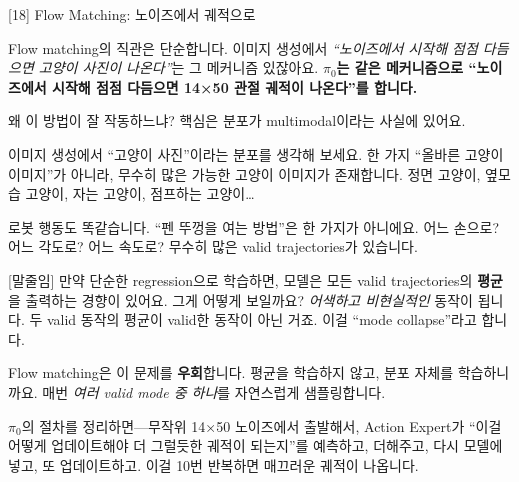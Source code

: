 \documentclass[aspectratio=169,10pt]{beamer}
\newenvironment{script}{%
  \footnotesize
  \setlength{\parskip}{0.5em}
  \setlength{\parindent}{0pt}
}{}
\begin{document}
\begin{frame}{[18] Flow Matching: 노이즈에서 궤적으로}
\begin{script}
Flow matching의 직관은 단순합니다. 이미지 생성에서 \textit{``노이즈에서 시작해 점점 다듬으면 고양이 사진이 나온다''}는 그 메커니즘 있잖아요. \textbf{$\pi_0$는 같은 메커니즘으로 ``노이즈에서 시작해 점점 다듬으면 14×50 관절 궤적이 나온다''를 합니다.}

왜 이 방법이 잘 작동하느냐? 핵심은 \alert{분포가 multimodal}이라는 사실에 있어요.

이미지 생성에서 ``고양이 사진''이라는 분포를 생각해 보세요. 한 가지 ``올바른 고양이 이미지''가 아니라, 무수히 많은 가능한 고양이 이미지가 존재합니다. 정면 고양이, 옆모습 고양이, 자는 고양이, 점프하는 고양이…

로봇 행동도 똑같습니다. ``펜 뚜껑을 여는 방법''은 한 가지가 아니에요. 어느 손으로? 어느 각도로? 어느 속도로? 무수히 많은 valid trajectories가 있습니다.

[말줄임] 만약 단순한 regression으로 학습하면, 모델은 모든 valid trajectories의 \textbf{평균}을 출력하는 경향이 있어요. 그게 어떻게 보일까요? \textit{어색하고 비현실적인} 동작이 됩니다. 두 valid 동작의 평균이 valid한 동작이 아닌 거죠. 이걸 ``mode collapse''라고 합니다.

Flow matching은 이 문제를 \textbf{우회}합니다. 평균을 학습하지 않고, 분포 자체를 학습하니까요. 매번 \textit{여러 valid mode 중 하나}를 자연스럽게 샘플링합니다.

$\pi_0$의 절차를 정리하면---무작위 14×50 노이즈에서 출발해서, Action Expert가 ``이걸 어떻게 업데이트해야 더 그럴듯한 궤적이 되는지''를 예측하고, 더해주고, 다시 모델에 넣고, 또 업데이트하고. 이걸 \alert{10번 반복}하면 매끄러운 궤적이 나옵니다.
\end{script}
\end{frame}
\end{document}
